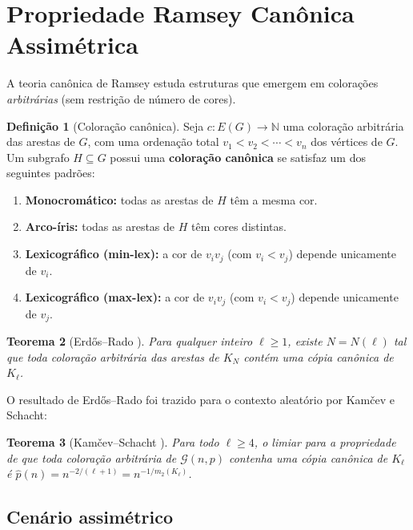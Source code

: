 \documentclass[reqno, 12pt]{amsart}
\numberwithin{equation}{section}
\theoremstyle{plain}
\newtheorem{theorem}{Teorema}[section]
\theoremstyle{definition}
\newtheorem{definition}[theorem]{Definição}
\newcommand{\Gnp}{\mathcal{G}(n,p)}
\newcommand{\mdens}{m_2}
\begin{document}
\section{Propriedade Ramsey Canônica Assimétrica} \label{sec:canonico}

A teoria canônica de Ramsey estuda estruturas que emergem em colorações
\emph{arbitrárias} (sem restrição de número de cores).

\begin{definition}[Coloração canônica]
\label{def:canonica}
Seja $c : E(G) \to \mathbb{N}$ uma coloração arbitrária das arestas de $G$,
com uma ordenação total $v_1 < v_2 < \cdots < v_n$ dos vértices de $G$.
Um subgrafo $H \subseteq G$ possui uma \textbf{coloração canônica} se
satisfaz um dos seguintes padrões:
\begin{enumerate}
  \item \textbf{Monocromático:} todas as arestas de $H$ têm a mesma cor.
  \item \textbf{Arco-íris:} todas as arestas de $H$ têm cores distintas.
  \item \textbf{Lexicográfico (min-lex):} a cor de $v_iv_j$ (com $v_i < v_j$)
    depende unicamente de $v_i$.
  \item \textbf{Lexicográfico (max-lex):} a cor de $v_iv_j$ (com $v_i < v_j$)
    depende unicamente de $v_j$.
\end{enumerate}
\end{definition}

\begin{theorem}[Erdős--Rado \cite{erdos1950combinatorial}]
Para qualquer inteiro $\ell \ge 1$, existe $N = N(\ell)$ tal que toda coloração
arbitrária das arestas de $K_N$ contém uma cópia canônica de $K_\ell$.
\end{theorem}

O resultado de Erdős--Rado foi trazido para o contexto aleatório por Kamčev e Schacht:

\begin{theorem}[Kamčev--Schacht \cite{kamcev2023canonical}]
\label{thm:kamcev}
Para todo $\ell \ge 4$, o limiar para a propriedade de que toda coloração
arbitrária de $\Gnp$ contenha uma cópia canônica de $K_\ell$ é
$\hat{p}(n) = n^{-2/(\ell+1)} = n^{-1/\mdens(K_\ell)}$.
\end{theorem}

\subsection{Cenário assimétrico}
\end{document}
